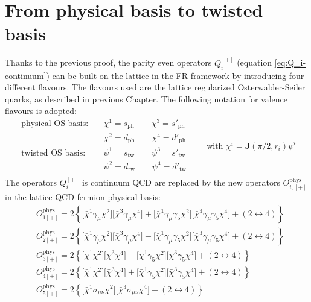 \documentclass[english, LaM, oneside, noexaminfo]{sapthesis}
\begin{document}
\section{From physical basis to twisted basis}
\noindent
Thanks to the previous proof, the parity even operators $Q_{i}^{[+]}$ (equation \ref{eq:Q_i-continuum}) can be built on the lattice in the FR framework by introducing four different flavours.
The flavours used are the lattice regularized Osterwalder-Seiler quarks, as described in previous Chapter.
The following notation for valence flavours is adopted:
\begin{equation*}
    \begin{aligned}
        \text{physical OS basis:}
        & \quad \chi^1 = s_\text{ph} \qquad \chi^3 = s'_\text{ph} \\
        & \quad \chi^2 = d_\text{ph} \qquad \chi^4 = d'_\text{ph} \\
        \text{twisted OS basis: }
        & \quad \psi^1 = s_\text{tw} \qquad \psi^3 = s'_\text{tw} \\
        & \quad \psi^2 = d_\text{tw} \qquad \psi^4 = d'_\text{tw} \\
    \end{aligned}
    \qquad
    \text{with } \chi^i = \mathbf{J}(\pi/2,r_i)\psi^i
\end{equation*}
The operators $Q_{i}^{[+]}$ is continuum QCD are replaced by the new operators $O_{i,[+]}^\text{phys}$ in the lattice QCD fermion physical basis:
\begin{equation*}
    \begin{split}
        & O_{1[+]}^\text{phys} = 2 \left\{\big[\bar\chi^1 \gamma_\mu \chi^2 \big] \big[\bar\chi^3 \gamma_\mu \chi^4 \big] + \big[ \bar\chi^1 \gamma_\mu \gamma_5 \chi^2 \big] \big[ \bar\chi^3 \gamma_\mu \gamma_5 \chi^4 \big] + \left(2\leftrightarrow 4\right)\right\} \\
        & O_{2[+]}^\text{phys} = 2 \left\{\big[\bar\chi^1 \gamma_\mu \chi^2 \big] \big[\bar\chi^3 \gamma_\mu \chi^4 \big] - \big[ \bar\chi^1 \gamma_\mu \gamma_5 \chi^2 \big] \big[ \bar\chi^3 \gamma_\mu \gamma_5 \chi^4 \big] + \left(2\leftrightarrow 4\right)\right\} \\
        & O_{3[+]}^\text{phys} = 2 \left\{\big[\bar\chi^1 \chi^2 \big] \big[ \bar\chi^3 \chi^4 \big] - \big[ \bar\chi^1 \gamma_5 \chi^2 \big] \big[ \bar\chi^3 \gamma_5 \chi^4\big] + \left(2\leftrightarrow 4\right)\right\} \\
        & O_{4[+]}^\text{phys} = 2 \left\{\big[\bar\chi^1 \chi^2 \big] \big[ \bar\chi^3 \chi^4 \big] + \big[ \bar\chi^1 \gamma_5 \chi^2 \big] \big[ \bar\chi^3 \gamma_5 \chi^4\big] + \left(2\leftrightarrow 4\right)\right\} \\
        & O_{5[+]}^\text{phys} = 2 \left\{\big[\bar\chi^1 \sigma_{\mu\nu} \chi^2 \big] \big[ \bar\chi^3 \sigma_{\mu\nu} \chi^4 \big] + \left(2\leftrightarrow 4\right)\right\} \\
    \end{split}
\end{equation*}
\end{document}
